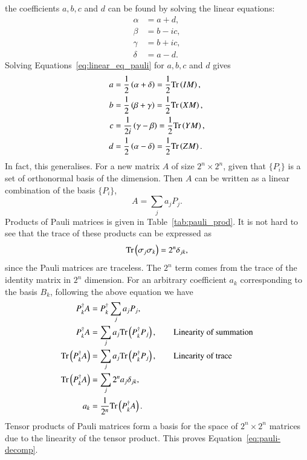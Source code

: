 the coefficients $a, b, c$ and $d$ can be found by solving the linear equations:
\begin{align}
	\label{eq:linear_eq_pauli}
	\alpha &= a + d, \\
	\beta &= b - i c, \\
	\gamma &= b + i c, \\
	\delta &= a - d.
\end{align}
Solving Equations~\eqref{eq:linear_eq_pauli} for $ a,b,c $ and $ d $ gives
\begin{align}
	\label{eq:solve_linear_eq_pauli}
	a &= \frac{1}{2} \left( \alpha + \delta \right) = \frac{1}{2} \tr{IM}, \\
	b &= \frac{1}{2} \left( \beta + \gamma \right) = \frac{1}{2}\tr{XM}, \\
	c &= \frac{1}{2i} \left( \gamma - \beta \right) = \frac{1}{2} \tr{YM}, \\
	d &= \frac{1}{2} \left( \alpha - \delta \right) = \frac{1}{2}\tr{ZM}. \\
\end{align}
In fact, this generalises. For a new matrix $ A $ of size $ 2^n \times 2^n $, given that $ \{ P_i \} $ is a set of orthonormal basis of the dimension. Then $ A $ can be written as a linear combination of the basis $ \{ P_i \} $,
\[ A = \sum_{j}a_jP_j. \]
Products of Pauli matrices is given in Table~\ref{tab:pauli_prod}. It is not hard to see that the trace of these products can be expressed as 
\[ \text{Tr}\left(\sigma_j\sigma_k\right) = 2^n \delta_{jk},\] since the Pauli matrices are traceless. The $ 2^n $ term comes from the trace of the identity matrix in $ 2^n $ dimension.
For an arbitrary coefficient $ a_k $ corresponding to the basis $ B_k $, following the above equation we have
\begin{align*}
	\label{eq:proof-of-pd}
	P^{\dagger}_kA  &= P_k^{\dagger}\sum_{j} a_j P_j, \\
	P^{\dagger}_k A &= \sum_j a_j \tr{P_k^{\dagger}P_j}, \quad\quad \text{Linearity of summation}\\
	\tr{P^{\dagger}_k A} &= \sum_j a_j \tr{P_k^{\dagger}P_j}, \quad\quad \text{Linearity of trace} \\
	\tr{P^{\dagger}_k A} &= \sum_j  2^n a_j\delta_{jk},   \\
	a_k &= \frac{1}{2^n}\tr{P^{\dagger}_k A}.
\end{align*}
Tensor products of Pauli matrices form a basis for the space of $ 2^n \times 2^n$ matrices due to the linearity of the tensor product. This proves Equation~\eqref{eq:pauli-decomp}.

